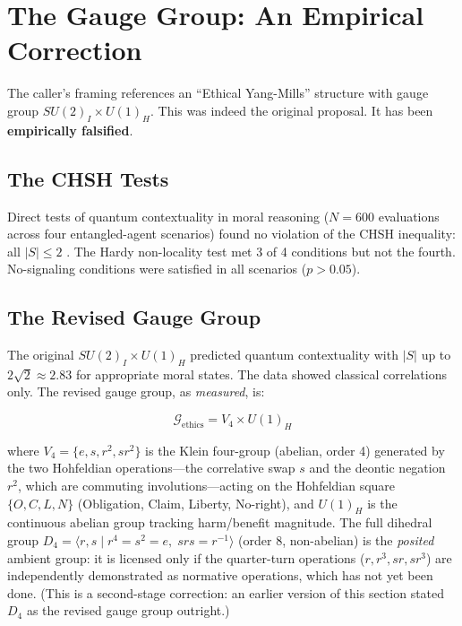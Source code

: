 \documentclass[12pt,letterpaper]{article}
\theoremstyle{definition}
\newcommand{\calG}{\mathcal{G}}
\begin{document}
\section{The Gauge Group: An Empirical Correction}
\label{sec:gauge}

The caller's framing references an ``Ethical Yang-Mills'' structure with gauge group $SU(2)_I \times U(1)_H$. This was indeed the original proposal. It has been \textbf{empirically falsified}.

\subsection{The CHSH Tests}

Direct tests of quantum contextuality in moral reasoning ($N = 600$ evaluations across four entangled-agent scenarios) found no violation of the CHSH inequality: all $|S| \leq 2$ \cite[\S12.9]{bond2026ge}. The Hardy non-locality test met 3 of 4 conditions but not the fourth. No-signaling conditions were satisfied in all scenarios ($p > 0.05$).

\subsection{The Revised Gauge Group}

The original $SU(2)_I \times U(1)_H$ predicted quantum contextuality with $|S|$ up to $2\sqrt{2} \approx 2.83$ for appropriate moral states. The data showed classical correlations only. The revised gauge group, as \emph{measured}, is:

\begin{equation}
\boxed{\calG_{\text{ethics}} = V_4 \times U(1)_H}
\end{equation}

where $V_4 = \{e, s, r^2, sr^2\}$ is the Klein four-group (abelian, order 4) generated by the two Hohfeldian operations---the correlative swap $s$ and the deontic negation $r^2$, which are commuting involutions---acting on the Hohfeldian square $\{O, C, L, N\}$ (Obligation, Claim, Liberty, No-right), and $U(1)_H$ is the continuous abelian group tracking harm/benefit magnitude. The full dihedral group $D_4 = \langle r, s \mid r^4 = s^2 = e,\; srs = r^{-1} \rangle$ (order 8, non-abelian) is the \emph{posited} ambient group: it is licensed only if the quarter-turn operations ($r, r^3, sr, sr^3$) are independently demonstrated as normative operations, which has not yet been done. (This is a second-stage correction: an earlier version of this section stated $D_4$ as the revised gauge group outright.)
\end{document}
